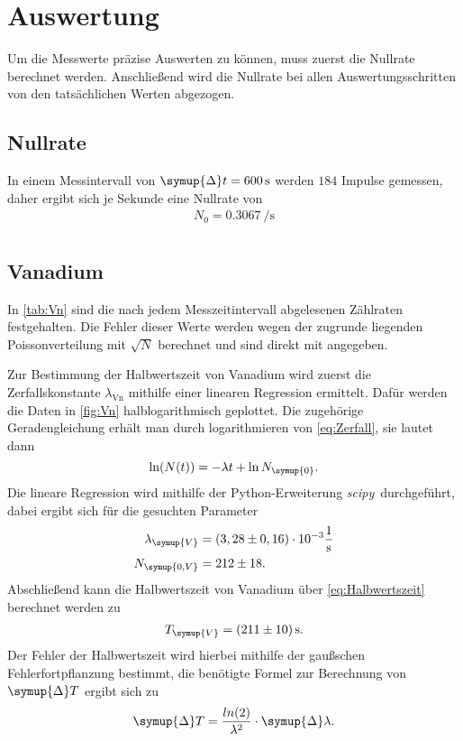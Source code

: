 \section{Auswertung}
\label{sec:Auswertung}

Um die Messwerte präzise Auswerten zu können, muss zuerst die Nullrate berechnet werden.
Anschließend wird die Nullrate bei allen Auswertungsschritten von den tatsächlichen Werten abgezogen.

\subsection{Nullrate}

In einem Messintervall von $\symup{\Delta}t=\qty{600}{\second}$ werden $184$ Impulse gemessen, daher
ergibt sich je Sekunde eine Nullrate von
\begin{gather*}
    N_0=\qty{0.3067}{\per\second} \\
\end{gather*}

\subsection{Vanadium}

In \autoref{tab:Vn} sind die nach jedem Messzeitintervall abgelesenen Zählraten festgehalten.
Die Fehler dieser Werte werden wegen der zugrunde liegenden Poissonverteilung mit $\sqrt{N}$ berechnet und sind
direkt mit angegeben.

Zur Bestimmung der Halbwertszeit von Vanadium wird zuerst die Zerfallskonstante $\lambda_\text{Vn}$ mithilfe einer linearen Regression
ermittelt.
Dafür werden die Daten in \autoref{fig:Vn} halblogarithmisch geplottet.
Die zugehörige Geradengleichung erhält man durch logarithmieren von \eqref{eq:Zerfall}, sie lautet dann
\begin{equation*}
  \ln(N(t)) = -\lambda t + \ln{N_{\symup{0}}}.
\end{equation*}
Die lineare Regression wird mithilfe der Python-Erweiterung \textit{scipy}\,\cite{scipy} durchgeführt, dabei
ergibt sich für die gesuchten Parameter
\begin{align*}
  \lambda_{\symup{V}} &= (3,28 \pm 0,16) \cdot 10^{-3} \unit{\per\second} \\
  N_{\symup{0, V}} &= 212 \pm 18.
\end{align*}
Abschließend kann die Halbwertszeit von Vanadium über \eqref{eq:Halbwertszeit} berechnet werden zu
\begin{gather*}
  T_{\symup{V}} = \qty{211+-10}{\second}.
\end{gather*}
Der Fehler der Halbwertszeit wird hierbei mithilfe der gaußschen Fehlerfortpflanzung bestimmt, die
benötigte Formel zur Berechnung von $\symup{\Delta}T$ ergibt sich zu
\begin{equation}
  \label{delta_t}
  \symup{\Delta}T = \frac{ln(2)}{\lambda^2} \cdot \symup{\Delta} \lambda. 
\end{equation}

